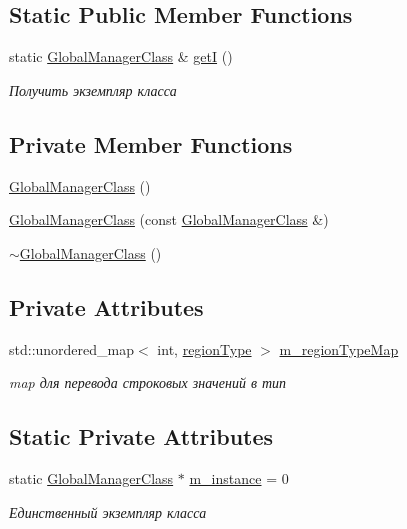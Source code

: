 \subsection*{Static Public Member Functions}
\begin{DoxyCompactItemize}
\item 
static \hyperlink{class_global_manager_class}{Global\+Manager\+Class} \& \hyperlink{class_global_manager_class_ac6cf763853c150bb15e0a5bda7f5f66c}{getI} ()
\begin{DoxyCompactList}\small\item\em Получить экземпляр класса \end{DoxyCompactList}\end{DoxyCompactItemize}
\subsection*{Private Member Functions}
\begin{DoxyCompactItemize}
\item 
\hyperlink{class_global_manager_class_ac7c79e01f51681e21bff72c14f882c77}{Global\+Manager\+Class} ()
\item 
\hyperlink{class_global_manager_class_aa7446a52d50482eb720912353c1ea579}{Global\+Manager\+Class} (const \hyperlink{class_global_manager_class}{Global\+Manager\+Class} \&)
\item 
\hyperlink{class_global_manager_class_a88480796ae67dc8586a67a2d5c0b8806}{$\sim$\+Global\+Manager\+Class} ()
\end{DoxyCompactItemize}
\subsection*{Private Attributes}
\begin{DoxyCompactItemize}
\item 
std\+::unordered\+\_\+map$<$ int, \hyperlink{class_global_manager_class_a794b4a5298c61f8d25d9da44b7826857}{region\+Type} $>$ \hyperlink{class_global_manager_class_a081d31af50e3490f9f18db7ed09f224b}{m\+\_\+region\+Type\+Map}
\begin{DoxyCompactList}\small\item\em map для перевода строковых значений в тип \end{DoxyCompactList}\end{DoxyCompactItemize}
\subsection*{Static Private Attributes}
\begin{DoxyCompactItemize}
\item 
static \hyperlink{class_global_manager_class}{Global\+Manager\+Class} $\ast$ \hyperlink{class_global_manager_class_af0b5d5dfa801127dbd798fbe0a759171}{m\+\_\+instance} = 0
\begin{DoxyCompactList}\small\item\em Единственный экземпляр класса \end{DoxyCompactList}\end{DoxyCompactItemize}


